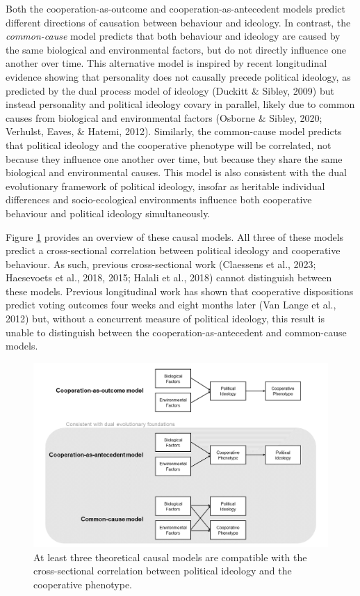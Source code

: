 \documentclass[
  man,floatsintext]{apa6}
\begin{document}
Both the cooperation-as-outcome and cooperation-as-antecedent models predict different directions of causation between behaviour and ideology. In contrast, the \emph{common-cause} model predicts that both behaviour and ideology are caused by the same biological and environmental factors, but do not directly influence one another over time. This alternative model is inspired by recent longitudinal evidence showing that personality does not causally precede political ideology, as predicted by the dual process model of ideology (Duckitt \& Sibley, 2009) but instead personality and political ideology covary in parallel, likely due to common causes from biological and environmental factors (Osborne \& Sibley, 2020; Verhulst, Eaves, \& Hatemi, 2012). Similarly, the common-cause model predicts that political ideology and the cooperative phenotype will be correlated, not because they influence one another over time, but because they share the same biological and environmental causes. This model is also consistent with the dual evolutionary framework of political ideology, insofar as heritable individual differences and socio-ecological environments influence both cooperative behaviour and political ideology simultaneously.

Figure \ref{fig:theoreticalModels} provides an overview of these causal models. All three of these models predict a cross-sectional correlation between political ideology and cooperative behaviour. As such, previous cross-sectional work (Claessens et al., 2023; Haesevoets et al., 2018, 2015; Halali et al., 2018) cannot distinguish between these models. Previous longitudinal work has shown that cooperative dispositions predict voting outcomes four weeks and eight months later (Van Lange et al., 2012) but, without a concurrent measure of political ideology, this result is unable to distinguish between the cooperation-as-antecedent and common-cause models.



\begin{figure}
\includegraphics[width=\textwidth]{images/theoreticalModels} \caption{At least three theoretical causal models are compatible with the cross-sectional correlation between political ideology and the cooperative phenotype.}\label{fig:theoreticalModels}
\end{figure}
\end{document}
